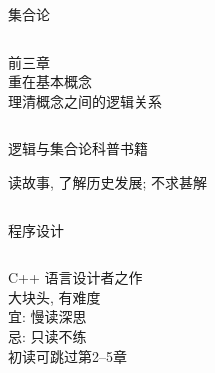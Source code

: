\begin{frame}{集合论}
  \begin{columns}
      \begin{center}
	前三章\\[3pt]
	重在基本概念\\[3pt]
	理清概念之间的逻辑关系
      \end{center}
  \end{columns}
\end{frame}

\begin{frame}{逻辑与集合论科普书籍}
  \begin{center}
    读故事, 了解历史发展; 不求甚解
  \end{center}

  \begin{columns}
  \end{columns}
\end{frame}

\begin{frame}{程序设计}
  \begin{columns}
      \begin{center}
	C++ 语言设计者之作\\[3pt]
	大块头, 有难度\\[8pt]
	宜: 慢读深思\\[3pt]
	忌: 只读不练\\[15pt]

	初读可跳过第2--5章\\
      \end{center}
  \end{columns}
\end{frame}


